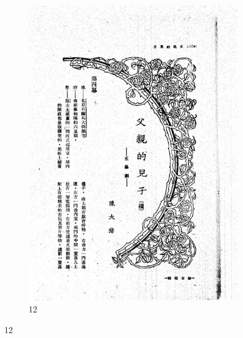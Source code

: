 \documentclass[12pt,twoside]{report}
\begin{document}
\begin{appendices}
\begin{figure}[htbp]
\begin{subfigure}[b]{0.23\linewidth}
        \includegraphics[width=\linewidth]{./figures/testset/12.jpg}
        \caption{12}
        \label{fig:test_12}
    \end{subfigure}
  

\end{figure}
\end{appendices}
\end{document}
